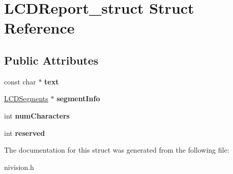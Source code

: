 \hypertarget{structLCDReport__struct}{\section{\-L\-C\-D\-Report\-\_\-struct \-Struct \-Reference}
\label{structLCDReport__struct}
}
\subsection*{\-Public \-Attributes}
\begin{DoxyCompactItemize}
\item 
\hypertarget{structLCDReport__struct_a8e5652660acf87b59ff1d3298cc8889a}{const char $\ast$ {\bfseries text}}\label{structLCDReport__struct_a8e5652660acf87b59ff1d3298cc8889a}

\item 
\hypertarget{structLCDReport__struct_a67982aa26d505b5a83cf50e7a89fcdcd}{\hyperlink{structLCDSegments__struct}{\-L\-C\-D\-Segments} $\ast$ {\bfseries segment\-Info}}\label{structLCDReport__struct_a67982aa26d505b5a83cf50e7a89fcdcd}

\item 
\hypertarget{structLCDReport__struct_abaef90e8340b143532f3fd2d59e8a9e3}{int {\bfseries num\-Characters}}\label{structLCDReport__struct_abaef90e8340b143532f3fd2d59e8a9e3}

\item 
\hypertarget{structLCDReport__struct_a73ebedf83a91bbc65c1380cf697d5c0f}{int {\bfseries reserved}}\label{structLCDReport__struct_a73ebedf83a91bbc65c1380cf697d5c0f}

\end{DoxyCompactItemize}


\-The documentation for this struct was generated from the following file\-:\begin{DoxyCompactItemize}
\item 
nivision.\-h\end{DoxyCompactItemize}
